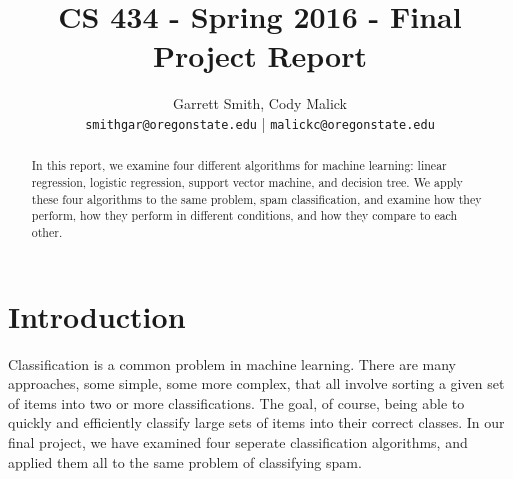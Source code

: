\documentclass[10pt,letterpaper,onecolumn,draftclsnofoot]{IEEEtran}
\begin{document}
\begin{titlepage}
  \title{CS 434 - Spring 2016 - Final Project Report}
  \author{Garrett Smith, Cody Malick\\
  \texttt{smithgar@oregonstate.edu} | \texttt{malickc@oregonstate.edu}}
  \maketitle
  \vspace*{4cm}
  \begin{abstract}
      \noindent In this report, we examine four different algorithms for machine
      learning: linear regression, logistic regression, support vector machine,
      and decision tree. We apply these four algorithms to the same problem, spam
      classification, and examine how they perform, how they perform in different
      conditions, and how they compare to each other.

  \end{abstract}
\end{titlepage}

\tableofcontents
\clearpage
\section{Introduction}
Classification is a common problem in machine learning. There are many approaches,
some simple, some more complex, that all involve sorting a given set of items into
two or more classifications. The goal, of course, being able to quickly and efficiently
classify large sets of items into their correct classes. In our final project, we
have examined four seperate classification algorithms, and applied them all to the
same problem of classifying spam.
\end{document}
